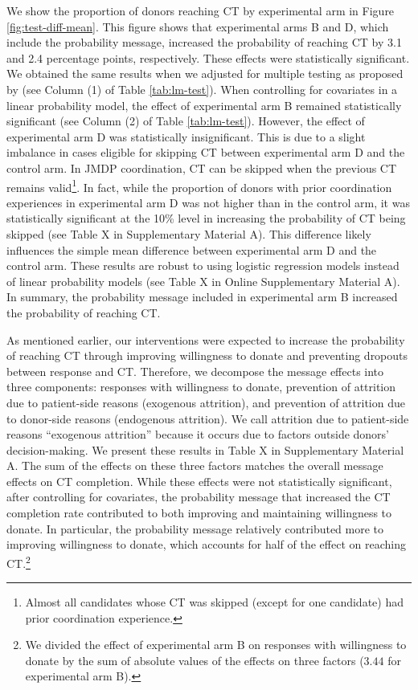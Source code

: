 \documentclass[12pt, a4paper]{article}
\begin{document}
We show the proportion of donors reaching CT by experimental arm in Figure \ref{fig:test-diff-mean}. This figure shows that experimental arms B and D, which include the probability message, increased the probability of reaching CT by 3.1 and 2.4 percentage points, respectively. These effects were statistically significant. We obtained the same results when we adjusted for multiple testing as proposed by \citet{List2019} (see Column (1) of Table \ref{tab:lm-test}). When controlling for covariates in a linear probability model, the effect of experimental arm B remained statistically significant (see Column (2) of Table \ref{tab:lm-test}). However, the effect of experimental arm D was statistically insignificant. This is due to a slight imbalance in cases eligible for skipping CT between experimental arm D and the control arm. In JMDP coordination, CT can be skipped when the previous CT remains valid\footnote{Almost all candidates whose CT was skipped (except for one candidate) had prior coordination experience.}. In fact, while the proportion of donors with prior coordination experiences in experimental arm D was not higher than in the control arm, it was statistically significant at the 10\% level in increasing the probability of CT being skipped (see Table X in Supplementary Material A). This difference likely influences the simple mean difference between experimental arm D and the control arm. These results are robust to using logistic regression models instead of linear probability models (see Table X in Online Supplementary Material A). In summary, the probability message included in experimental arm B increased the probability of reaching CT.

As mentioned earlier, our interventions were expected to increase the probability of reaching CT through improving willingness to donate and preventing dropouts between response and CT. Therefore, we decompose the message effects into three components: responses with willingness to donate, prevention of attrition due to patient-side reasons (exogenous attrition), and prevention of attrition due to donor-side reasons (endogenous attrition). We call attrition due to patient-side reasons ``exogenous attrition'' because it occurs due to factors outside donors' decision-making. We present these results in Table X in Supplementary Material A. The sum of the effects on these three factors matches the overall message effects on CT completion. While these effects were not statistically significant, after controlling for covariates, the probability message that increased the CT completion rate contributed to both improving and maintaining willingness to donate. In particular, the probability message relatively contributed more to improving willingness to donate, which accounts for half of the effect on reaching CT.\footnote{We divided the effect of experimental arm B on responses with willingness to donate by the sum of absolute values of the effects on three factors (\(3.44\) for experimental arm B).}
\end{document}
